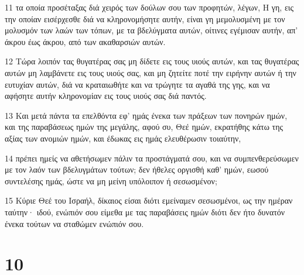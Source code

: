 \par 11 τα οποία προσέταξας διά χειρός των δούλων σου των προφητών, λέγων, Η γη, εις την οποίαν εισέρχεσθε διά να κληρονομήσητε αυτήν, είναι γη μεμολυσμένη με τον μολυσμόν των λαών των τόπων, με τα βδελύγματα αυτών, οίτινες εγέμισαν αυτήν, απ' άκρου έως άκρου, από των ακαθαρσιών αυτών.
\par 12 Τώρα λοιπόν τας θυγατέρας σας μη δίδετε εις τους υιούς αυτών, και τας θυγατέρας αυτών μη λαμβάνετε εις τους υιούς σας, και μη ζητείτε ποτέ την ειρήνην αυτών ή την ευτυχίαν αυτών, διά να κραταιωθήτε και να τρώγητε τα αγαθά της γης, και να αφήσητε αυτήν κληρονομίαν εις τους υιούς σας διά παντός.
\par 13 Και μετά πάντα τα επελθόντα εφ' ημάς ένεκα των πράξεων των πονηρών ημών, και της παραβάσεως ημών της μεγάλης, αφού συ, Θεέ ημών, εκρατήθης κάτω της αξίας των ανομιών ημών, και έδωκας εις ημάς ελευθέρωσιν τοιαύτην,
\par 14 πρέπει ημείς να αθετήσωμεν πάλιν τα προστάγματά σου, και να συμπενθερεύσωμεν με τον λαόν των βδελυγμάτων τούτων; δεν ήθελες οργισθή καθ' ημών, εωσού συντελέσης ημάς, ώστε να μη μείνη υπόλοιπον ή σεσωσμένον;
\par 15 Κύριε Θεέ του Ισραήλ, δίκαιος είσαι διότι εμείναμεν σεσωσμένοι, ως την ημέραν ταύτην· ιδού, ενώπιόν σου είμεθα με τας παραβάσεις ημών διότι δεν ήτο δυνατόν ένεκα τούτων να σταθώμεν ενώπιόν σου.

\chapter{10}

